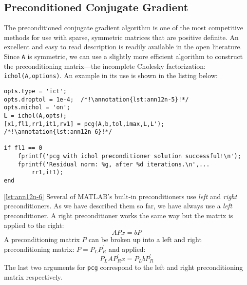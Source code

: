 \subsection{Preconditioned Conjugate Gradient}
The preconditioned conjugate gradient algorithm is one of the most competitive methods for use with sparse, symmetric matrices that are positive definite.  An excellent and easy to read description is readily available in the open literature.\cite{shewchuk1994conjugate}  Since \lstinline[style=myMatlab]{A} is symmetric, we can use a slightly more efficient algorithm to construct the preconditioning matrix---the incomplete Cholesky factorization: \lstinline[style=myMatlab]{ichol(A,options)}.  An example in its use is shown in the listing below:
\begin{lstlisting}[style=myMatlab]
%% preconditioned conjugate gradient
opts.type = 'ict';
opts.droptol = 1e-4;  /*!\annotation{lst:ann12n-5}!*/
opts.michol = 'on';
L = ichol(A,opts);
[x1,fl1,rr1,it1,rv1] = pcg(A,b,tol,imax,L,L'); /*!\annotation{lst:ann12n-6}!*/

if fl1 == 0
    fprintf('pcg with ichol preconditioner solution successful!\n');
    fprintf('Residual norm: %g, after %d iterations.\n',...
        rr1,it1);
end
\end{lstlisting}

\vspace{0.1cm}

\noindent \ref{lst:ann12n-6} Several of MATLAB's built-in preconditioners use \emph{left} and \emph{right} preconditioners.  As we have described them so far, we have always use a \emph{left} preconditioner.  A right preconditioner works the same way but the matrix is applied to the right:
$$APx = bP  $$
A preconditioning matrix $P$ can be broken up into a left and right preconditioning matrix: $P = P_L P_R^{\prime}$ and applied: $$P_L A P_R^{\prime} x = P_{L}bP_R^{\prime}$$
The last two arguments for \lstinline[style=myMatlab]{pcg} correspond to the left and right preconditioning matrix respectively.   

